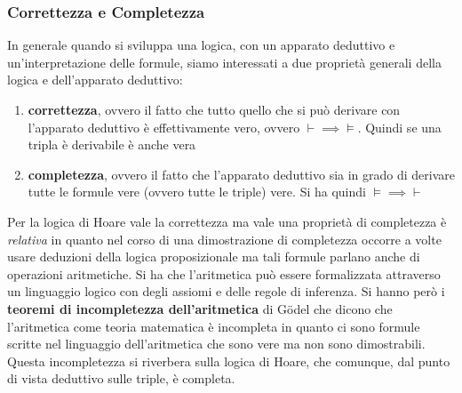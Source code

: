 \documentclass[a4paper,12pt, oneside]{book}
\begin{document}
\subsubsection{Correttezza e Completezza}
In generale quando si sviluppa una logica, con un apparato deduttivo e
un'interpretazione delle formule, siamo interessati a due proprietà generali
della logica e dell'apparato deduttivo:
\begin{enumerate}
  \item \textbf{correttezza}, ovvero il fatto che tutto quello che si può
  derivare con l'apparato deduttivo è effettivamente vero, ovvero
  $\vdash\implies\vDash$. Quindi se una tripla è derivabile è anche vera
  \item \textbf{completezza}, ovvero il fatto che l'apparato deduttivo sia in
  grado di derivare tutte le formule vere (ovvero tutte le triple) vere. Si ha
  quindi $\vDash\implies\vdash$
\end{enumerate}
Per la logica di Hoare vale la correttezza ma vale una proprietà di completezza
è \textit{relativa} in quanto nel corso di una dimostrazione di completezza
occorre a volte usare deduzioni della logica proposizionale ma tali formule
parlano anche di operazioni aritmetiche. Si ha che l'aritmetica può essere
formalizzata attraverso un linguaggio logico con degli assiomi e delle regole di
inferenza. Si hanno però i \textbf{teoremi di incompletezza dell'aritmetica} di
G\"{o}del che dicono che l'aritmetica come teoria matematica è incompleta in
quanto ci sono formule scritte nel linguaggio dell'aritmetica che sono vere ma
non sono dimostrabili. Questa incompletezza si riverbera sulla logica di Hoare,
che comunque, dal punto di vista deduttivo sulle triple, è completa.
\end{document}
